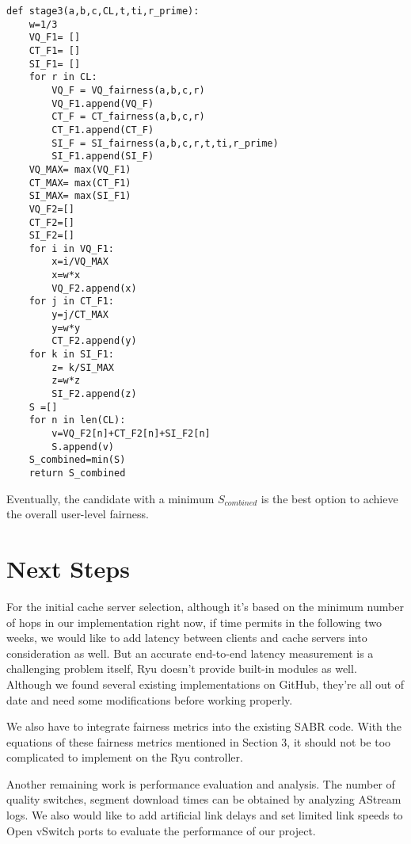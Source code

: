 \documentclass{article}
\begin{document}
\begin{verbatim}
def stage3(a,b,c,CL,t,ti,r_prime):
    w=1/3
    VQ_F1= []
    CT_F1= []
    SI_F1= []
    for r in CL:
        VQ_F = VQ_fairness(a,b,c,r)
        VQ_F1.append(VQ_F)
        CT_F = CT_fairness(a,b,c,r)
        CT_F1.append(CT_F)
        SI_F = SI_fairness(a,b,c,r,t,ti,r_prime)
        SI_F1.append(SI_F)
    VQ_MAX= max(VQ_F1)
    CT_MAX= max(CT_F1)
    SI_MAX= max(SI_F1)
    VQ_F2=[]
    CT_F2=[]
    SI_F2=[]
    for i in VQ_F1:
        x=i/VQ_MAX
        x=w*x
        VQ_F2.append(x)
    for j in CT_F1:
        y=j/CT_MAX
        y=w*y
        CT_F2.append(y)
    for k in SI_F1:
        z= k/SI_MAX
        z=w*z
        SI_F2.append(z)
    S =[]
    for n in len(CL):
        v=VQ_F2[n]+CT_F2[n]+SI_F2[n]
        S.append(v)
    S_combined=min(S)
    return S_combined
\end{verbatim}

Eventually, the candidate with a minimum $S_{combined}$ is the best option to achieve the overall user-level fairness.

\section{Next Steps}
For the initial cache server selection, although it's based on the minimum number of hops in our implementation right now, if time permits in the following two weeks, we would like to add latency between clients and cache servers into consideration as well. But an accurate end-to-end latency measurement is a challenging problem itself, Ryu doesn't provide built-in modules as well. Although we found several existing implementations on GitHub, they're all out of date and need some modifications before working properly. 

We also have to integrate fairness metrics into the existing SABR code. With the equations of these fairness metrics mentioned in Section 3, it should not be too complicated to implement on the Ryu controller. 

Another remaining work is performance evaluation and analysis. The number of quality switches, segment download times can be obtained by analyzing AStream logs. We also would like to add artificial link delays and set limited link speeds to Open vSwitch ports to evaluate the performance of our project. 

\printbibliography
\end{document}
